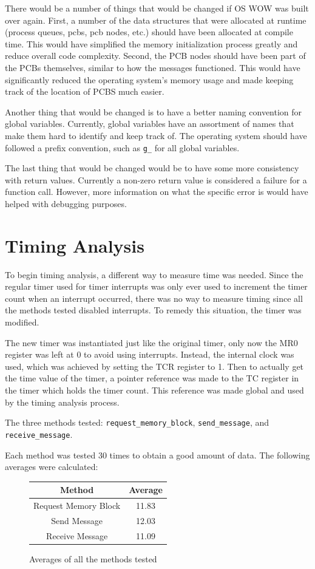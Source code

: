\documentclass[se]{uw-wkrpt}
\begin{document}
There would be a number of things that would be changed if OS WOW was built over again. First, a number of the data structures that were allocated at runtime (process queues, pcbs, pcb nodes, etc.) should have been allocated at compile time. This would have simplified the memory initialization process greatly and reduce overall code complexity. Second, the PCB nodes should have been part of the PCBs themselves, similar to how the messages functioned. This would have significantly reduced the operating system's memory usage and made keeping track of the location of PCBS much easier.

Another thing that would be changed is to have a better naming convention for global variables. Currently, global variables have an assortment of names that make them hard to identify and keep track of. The operating system should have followed a prefix convention, such as \texttt{g\_} for all global variables.

The last thing that would be changed would be to have some more consistency with return values. Currently a non-zero return value is considered a failure for a function call. However, more information on what the specific error is would have helped with debugging purposes.

\section{Timing Analysis}\label{sec:time}

To begin timing analysis, a different way to measure time was needed. Since the regular timer used for timer interrupts was only ever used to increment the timer count when an interrupt occurred, there was no way to measure timing since all the methods tested disabled interrupts. To remedy this situation, the timer was modified.

The new timer was instantiated just like the original timer, only now the MR0 register was left at 0 to avoid using interrupts. Instead, the internal clock was used, which was achieved by setting the TCR register to 1. Then to actually get the time value of the timer, a pointer reference was made to the TC register in the timer which holds the timer count. This reference was made global and used by the timing analysis process. 

The three methods tested: \texttt{request\_memory\_block}, \texttt{send\_message}, and \texttt{receive\_message}. 

Each method was tested 30 times to obtain a good amount of data. 
The following averages were calculated:
\begin{figure}
\begin{center}
\begin{tabular}{|c|c|}
\hline
Method & Average\\
\hline
Request Memory Block & 11.83 \\
\hline
Send Message & 12.03 \\
\hline
Receive Message & 11.09\\
\hline
\end{tabular}
\end{center}
\caption{Averages of all the methods tested}
\end{figure}
\end{document}
